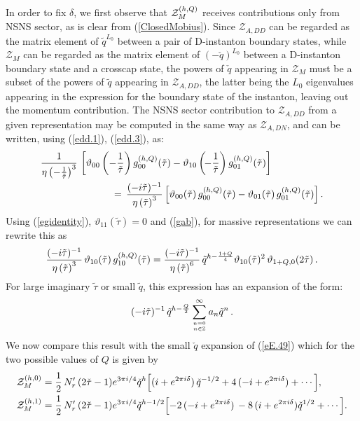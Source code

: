 \documentclass[12pt,a4paper]{article}
\newcommand{\be}{\begin{equation}}
\newcommand{\ee}{\end{equation}}
\newcommand{\refb}[1]{(\ref{#1})}
\def\ZZZ{{\hbox{ Z\kern-1.6mm Z}}}
\def\ZZZ{{\mathbb Z} }
\newcommand{\I}{\mathrm{i}}
\def\({\left(}
\def\){\right)}
\def\[{\left[}
\def\]{\right]}
\newcommand{\vt}{\vartheta}
\newcommand{\cZ}{\mathcal{Z}}
\def\ghQ{g^{(h,Q)}}
\def\cZi#1{\cZ^{(#1)}}
\def\I{i}
\begin{document}
In order to fix $\delta$, we first observe that ${\mathcal Z}^{(h,Q)}_{M}$ receives contributions only from NSNS sector, as is clear from
\refb{ClosedMobius}. Since $\cZ_{A,DD}$ can be regarded as the matrix element of $\tilde q^{L_0}$ between a pair of
D-instanton boundary states, while $\cZ_{M}$ can be regarded as the matrix element of $(-\check q)^{L_0}$
between a D-instanton boundary state and a crosscap state, the powers of $\check q$ appearing in $\cZ_{M}$ must be a subset
of the powers of $\tilde q$ appearing in $\cZ_{A,DD}$, the latter being the $L_0$ eigenvalues
appearing in the expression for the boundary state of the instanton, leaving out the momentum contribution.
The NSNS sector contribution to $\cZ_{A,DD}$ from a given representation
may be computed in the same way as $\cZ_{A,DN}$, and can be written, using \refb{edd.1}, \refb{edd.3}, as:
\be
\begin{split}
& {1\over \eta\(-\frac{1}{\tilde\tau}\)^3} \,
\[ \vt_{00}\(-\frac{1}{\tilde\tau}\) g^{(h,Q)}_{00}(\tilde \tau) -\vt_{10}\(\!-{1\over \tilde \tau}\) g^{(h,Q)}_{01}(\tilde \tau)\]
\\
& \hspace{1in} =\,  {(-i\tilde\tau)^{-1}\over \eta\(\tilde\tau\)^3}\,
\Bigl[ \vt_{00}( \tilde\tau)\, g^{(h,Q)}_{00}(\tilde \tau) -\vt_{01}(\tilde \tau)\,
g^{(h,Q)}_{01}(\tilde \tau)\Bigr]\, .
\end{split}
\ee
Using \refb{egidentity}, $\vt_{11}(\tilde\tau)=0$ and \refb{gab}, for massive representations
we can rewrite this as
\be
{(-i\tilde\tau)^{-1}\over \eta\(\tilde\tau\)^3} \, \vt_{10}(\tilde\tau)\, \ghQ_{10}(\tilde \tau)
= {(-i\tilde\tau)^{-1}\over \eta\(\tilde\tau\)^6} \, \tilde q^{h - {1+Q\over 4}}
\vt_{10}(\tilde\tau)^2\, \vt_{1+Q,0}(2\tilde\tau)\, .
\ee
For large imaginary
$\tilde\tau$ or small $\tilde q$, this expression has an expansion of the form:
\be\label{elargeq}
(-i\tilde\tau)^{-1} \, \tilde q^{h - {Q\over 2}} \sum_{n=0\atop n\in\ZZZ}^\infty a_n \tilde q^n\, .
\ee
We now compare this result with the small $\check q$ expansion of
\refb{eE.49} which for the two possible values of $Q$ is given by
\begin{subequations}  \label{eQ0Mtot}
\begin{align}
\label{eQ0M}
\cZi{h,0}_{M}
&=  {1 \over 2} \, N'_r\,  (2 \check \tau -1) e^{3 \pi i/4} \check q^h \Bigl[(\I + e^{2 \pi i \delta})
\, \check q^{-1/2} + 4 \, (-\I + e^{2 \pi i \delta}) + \cdots \Bigr],
\\
\label{eQ1M}
\cZi{h,1}_{M}
&= {1 \over 2}  \, N'_r\,  (2 \check \tau -1) e^{3 \pi i/4} \check q^{h-1/2}
\Bigl[-2 \, (-\I + e^{2 \pi i \delta}) \, - 8 \, (\I + 	e^{2 \pi i \delta}) \check q^{1/2}  + \cdots \Bigr].
\end{align}
\end{subequations}
\end{document}
